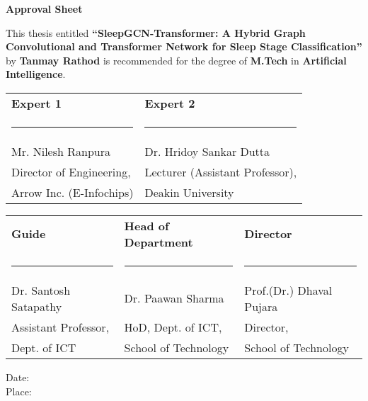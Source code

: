 \begin{center}
	\textbf{\large Approval Sheet}
\end{center}

This thesis entitled \textbf{\enquote{SleepGCN-Transformer: A Hybrid Graph Convolutional and Transformer Network for Sleep Stage Classification}} by \textbf{Tanmay Rathod} is recommended for the degree of \textbf{M.Tech} in \textbf{Artificial Intelligence}.

\vspace{1cm}

\begin{table}[h!]
	\centering
	\begin{tabular}{@{}m{}<{\centering} m{}<{\centering}@{}}
		\textbf{Expert 1} & \textbf{Expert 2} \\[2.5em]
		\rule{0.35\textwidth}{0.4pt} & \rule{0.35\textwidth}{0.4pt} \\[0.5em]
		Mr. Nilesh Ranpura & Dr. Hridoy Sankar Dutta \\[0.5em]
		Director of Engineering, & Lecturer (Assistant Professor), \\[0.5em]
		Arrow Inc. (E-Infochips) & Deakin University \\[3em]
	\end{tabular}
\end{table}

\begin{table}[h!]
	\centering
	\begin{tabular}{@{}m{}<{\centering} m{}<{\centering} m{}<{\centering}@{}}
		\textbf{Guide} & \textbf{Head of Department} & \textbf{Director} \\[2.5em]
		\rule{0.25\textwidth}{0.4pt} & \rule{0.25\textwidth}{0.4pt} & \rule{0.25\textwidth}{0.4pt} \\[0.5em]
		Dr. Santosh Satapathy & Dr. Paawan Sharma & Prof.(Dr.) Dhaval Pujara \\[0.5em]
		Assistant Professor, & HoD, Dept. of ICT, & Director, \\[0.5em]
		Dept. of ICT & School of Technology & School of Technology \\
	\end{tabular}
\end{table}

\vfill
\begin{flushleft}
	Date: \makebox[1.8in]{\hrulefill}\\
	Place: \makebox[1.8in]{\hrulefill}\\    
\end{flushleft}
